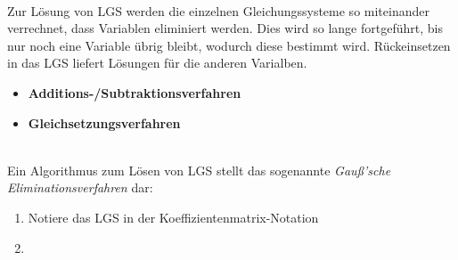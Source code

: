 \documentclass{article}
\begin{document}
\\
Zur Lösung von LGS werden die einzelnen Gleichungssysteme so miteinander verrechnet, dass Variablen eliminiert werden. Dies wird so lange fortgeführt, bis nur noch eine Variable übrig bleibt, wodurch diese bestimmt wird. Rückeinsetzen in das LGS liefert Lösungen für die anderen Varialben.
	\begin{itemize}
		\item \textbf{Additions-/Subtraktionsverfahren}


		\item \textbf{Gleichsetzungsverfahren}


	\end{itemize}


\newpage


\\
Ein Algorithmus zum Lösen von LGS stellt das sogenannte \textit{Gauß'sche Eliminationsverfahren} dar:
	\begin{enumerate}
		\item Notiere das LGS in der Koeffizientenmatrix-Notation
		
		
		\item 
	\end{enumerate}

\newpage
\end{document}
